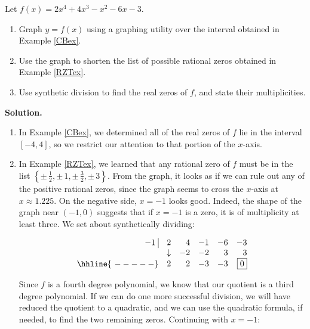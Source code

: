 \documentclass{ximera}
\begin{document}
\begin{example}  Let $f(x) = 2x^4+4x^3-x^2-6x-3$.  

\begin{enumerate}

\item  Graph $y=f(x)$ using a graphing utility over the interval  obtained in Example \ref{CBex}.

\item  Use the graph to shorten the list of possible rational zeros obtained in Example \ref{RZTex}.

\item  Use synthetic division to find the real zeros of $f$, and state their multiplicities.


\end{enumerate}

{\bf Solution.}

\begin{enumerate}

\item  In Example \ref{CBex}, we determined all of the real zeros of $f$ lie in the interval $[-4, 4]$, so we restrict our attention to that portion of the $x$-axis.

\item  In Example \ref{RZTex}, we learned that any rational zero of $f$ must be in the list $\left\{\pm \, \frac{1}{2}, \pm \, 1, \pm \, \frac{3}{2}, \pm \, 3\right\}$.  From the graph, it looks as if we can rule out any of the positive rational zeros, since the graph seems to cross the $x$-axis at $x \approx 1.225$.  On the negative side, $x=-1$ looks good. Indeed,  the shape  of the graph near $(-1,0)$ suggests that if $x=-1$ is a zero, it is of multiplicity at least three.  We set about synthetically dividing:
 
\[\begin{array}{rrrrrr}

 -1 \, \, \vline& 2 & 4 & -1  & -6 & -3 \\

  & \downarrow     &  -2  &  -2  & 3 & 3\\ \hhline{~-----} 
  
  &  2            &   2  & -3 & -3 &  \fbox{$0$}  \\

\end{array}\]

Since $f$ is a fourth degree polynomial, we know that our quotient is a third degree polynomial.  If we can do one more successful division, we will have reduced the quotient  to a quadratic, and we can use the quadratic formula, if needed, to find the two  remaining  zeros.  Continuing with $x=-1$:


\end{enumerate}
\end{example}
\end{document}
